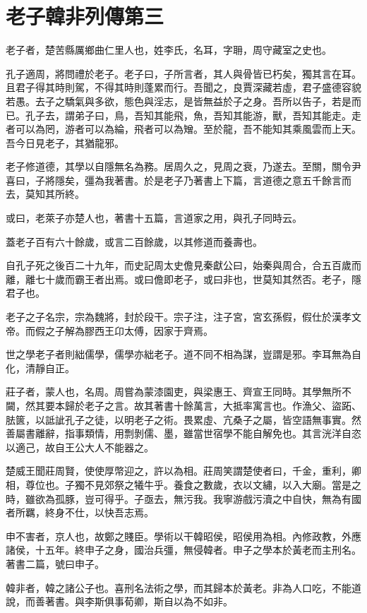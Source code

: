 \chapter{老子韓非列傳第三}

老子者，楚苦縣厲鄉曲仁里人也，姓李氏，名耳，字耼，周守藏室之史也。

孔子適周，將問禮於老子。老子曰，子所言者，其人與骨皆已朽矣，獨其言在耳。且君子得其時則駕，不得其時則蓬累而行。吾聞之，良賈深藏若虛，君子盛德容貌若愚。去子之驕氣與多欲，態色與淫志，是皆無益於子之身。吾所以告子，若是而已。孔子去，謂弟子曰，鳥，吾知其能飛，魚，吾知其能游，獸，吾知其能走。走者可以為罔，游者可以為綸，飛者可以為矰。至於龍，吾不能知其乘風雲而上天。吾今日見老子，其猶龍邪。

老子修道德，其學以自隱無名為務。居周久之，見周之衰，乃遂去。至關，關令尹喜曰，子將隱矣，彊為我著書。於是老子乃著書上下篇，言道德之意五千餘言而去，莫知其所終。

或曰，老萊子亦楚人也，著書十五篇，言道家之用，與孔子同時云。

蓋老子百有六十餘歲，或言二百餘歲，以其修道而養壽也。

自孔子死之後百二十九年，而史記周太史儋見秦獻公曰，始秦與周合，合五百歲而離，離七十歲而霸王者出焉。或曰儋即老子，或曰非也，世莫知其然否。老子，隱君子也。

老子之子名宗，宗為魏將，封於段干。宗子注，注子宮，宮玄孫假，假仕於漢孝文帝。而假之子解為膠西王卬太傅，因家于齊焉。

世之學老子者則絀儒學，儒學亦絀老子。道不同不相為謀，豈謂是邪。李耳無為自化，清靜自正。

莊子者，蒙人也，名周。周嘗為蒙漆園吏，與梁惠王、齊宣王同時。其學無所不闚，然其要本歸於老子之言。故其著書十餘萬言，大抵率寓言也。作漁父、盜跖、胠篋，以詆訿孔子之徒，以明老子之術。畏累虛、亢桑子之屬，皆空語無事實。然善屬書離辭，指事類情，用剽剝儒、墨，雖當世宿學不能自解免也。其言洸洋自恣以適己，故自王公大人不能器之。

楚威王聞莊周賢，使使厚幣迎之，許以為相。莊周笑謂楚使者曰，千金，重利，卿相，尊位也。子獨不見郊祭之犧牛乎。養食之數歲，衣以文繡，以入大廟。當是之時，雖欲為孤豚，豈可得乎。子亟去，無污我。我寧游戲污瀆之中自快，無為有國者所羈，終身不仕，以快吾志焉。

申不害者，京人也，故鄭之賤臣。學術以干韓昭侯，昭侯用為相。內修政教，外應諸侯，十五年。終申子之身，國治兵彊，無侵韓者。申子之學本於黃老而主刑名。著書二篇，號曰申子。

韓非者，韓之諸公子也。喜刑名法術之學，而其歸本於黃老。非為人口吃，不能道說，而善著書。與李斯俱事荀卿，斯自以為不如非。

